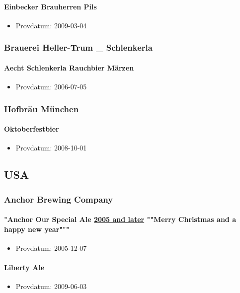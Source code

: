 \documentclass[11pt]{article}
\begin{document}
\paragraph{Einbecker Brauherren Pils}
\label{sec:org5ac60d0}
\begin{itemize}
\item Provdatum: 2009-03-04
\end{itemize}
\subsubsection{Brauerei Heller-Trum \_ Schlenkerla}
\label{sec:org7710fc3}
\paragraph{Aecht Schlenkerla Rauchbier Märzen}
\label{sec:orgb9abb27}
\begin{itemize}
\item Provdatum: 2006-07-05
\end{itemize}
\subsubsection{Hofbräu München}
\label{sec:org4b863c0}
\paragraph{Oktoberfestbier}
\label{sec:org5445a9c}
\begin{itemize}
\item Provdatum: 2008-10-01
\end{itemize}
\subsection{USA}
\label{sec:orgd5f4bc6}
\subsubsection{Anchor Brewing Company}
\label{sec:org3f13d8b}
\paragraph{"Anchor Our Special Ale \underline{2005 and later} ""Merry Christmas and a happy new year"""}
\label{sec:org68ea657}
\begin{itemize}
\item Provdatum: 2005-12-07
\end{itemize}
\paragraph{Liberty Ale}
\label{sec:org57d733c}
\begin{itemize}
\item Provdatum: 2009-06-03
\end{itemize}
\end{document}
